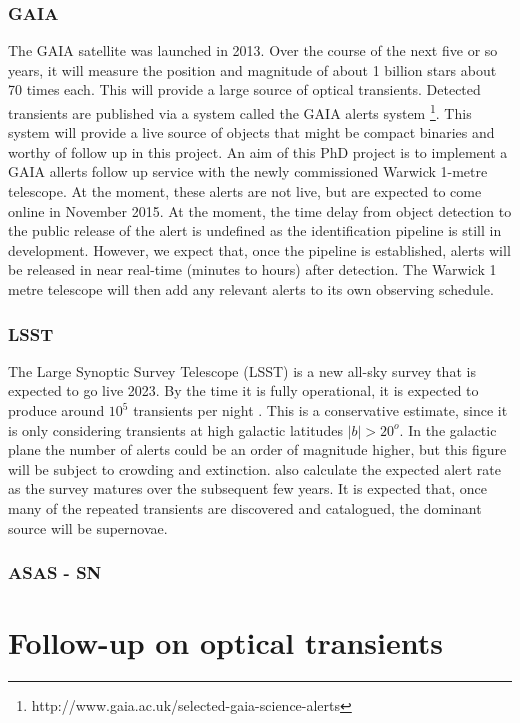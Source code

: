 \documentclass[a4paper,fleqn,usenatbib]{mnras}
\begin{document}
\subsubsection{GAIA}
The GAIA satellite was launched in 2013. Over the course of the next five or so years, it will measure the position and magnitude of about 1 billion stars about 70 times each. This will provide a large source of optical transients. Detected transients are published via a system called the GAIA alerts system  \footnote{http://www.gaia.ac.uk/selected-gaia-science-alerts}. This system will provide a live source of objects that might be compact binaries and worthy of follow up in this project. An aim of this PhD project is to implement a GAIA allerts follow up service with the newly commissioned Warwick 1-metre telescope.  At the moment, these alerts are not live, but are expected to come online in November 2015. At the moment, the time delay from object detection to the public release of the alert is undefined as the identification pipeline is still in development. However, we expect that, once the pipeline is established, alerts will be released in near real-time (minutes to hours) after detection. The Warwick 1 metre telescope will then add any relevant alerts to its own observing schedule.  

\subsubsection{LSST}
The Large Synoptic Survey Telescope (LSST) is a new all-sky survey that is expected to go live 2023. By the time it is fully operational, it is expected to produce around $10^5$ transients per night \citep{Ridgway2014}. This is a conservative estimate, since it is only considering transients at high galactic latitudes $|b| > 20^o$. In the galactic plane the number of alerts could be an order of magnitude higher, but this figure will be subject to crowding and extinction. \citet{Ridgway2014} also calculate the expected alert rate as the survey matures over the subsequent few years. It is expected that, once many of the repeated transients are discovered and catalogued, the dominant source will be supernovae. 

\subsubsection{ASAS - SN}

\section{Follow-up on optical transients}
\end{document}
